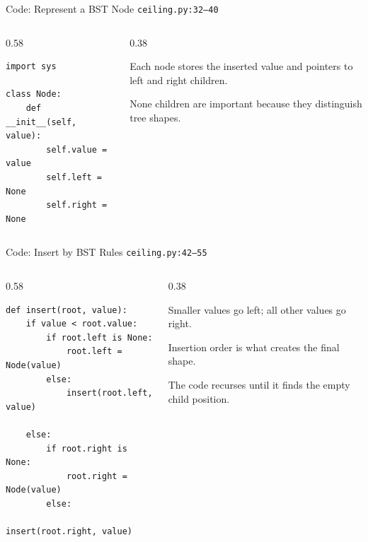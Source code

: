 \documentclass[aspectratio=169,11pt]{beamer}
\begin{document}
\begin{frame}[fragile]{Code: Represent a BST Node}
\scriptsize
{} \texttt{ceiling.py:32--40}

\vspace{0.08cm}
\begin{columns}[T,totalwidth=\textwidth]
\begin{column}{0.58\textwidth}
\begin{lstlisting}[style=cpcode]
import sys

class Node:
    def __init__(self, value):
        self.value = value
        self.left = None
        self.right = None
\end{lstlisting}
\end{column}
\begin{column}{0.38\textwidth}
\begin{tightitemize}
  \item Each node stores the inserted value and pointers to left and right children.
  \item None children are important because they distinguish tree shapes.
\end{tightitemize}
\end{column}
\end{columns}
\end{frame}

\begin{frame}[fragile]{Code: Insert by BST Rules}
\scriptsize
{} \texttt{ceiling.py:42--55}

\vspace{0.08cm}
\begin{columns}[T,totalwidth=\textwidth]
\begin{column}{0.58\textwidth}
\begin{lstlisting}[style=cpcode]
def insert(root, value):
    if value < root.value:
        if root.left is None:
            root.left = Node(value)
        else:
            insert(root.left, value)

    else:
        if root.right is None:
            root.right = Node(value)
        else:
            insert(root.right, value)
\end{lstlisting}
\end{column}
\begin{column}{0.38\textwidth}
\begin{tightitemize}
  \item Smaller values go left; all other values go right.
  \item Insertion order is what creates the final shape.
  \item The code recurses until it finds the empty child position.
\end{tightitemize}
\end{column}
\end{columns}
\end{frame}
\end{document}
